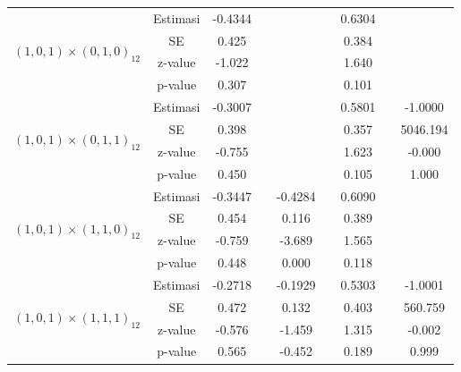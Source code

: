\begin{enumerate}[label=\alph*.]
\begin{longtable}{|c|c|c|c|c|c|c|c|c|}
            \multirow{4}{*}{$(1,0,1)\times(0,1,0)_{12}$}
            & Estimasi & -0.4344  & {} & {} & {} & 0.6304 & {} & {}\\ \cline{2-9}
            & SE       & 0.425 & {} & {} & {} & 0.384 & {} & {}\\ \cline{2-9}
            & z-value  & -1.022   & {} & {} & {} & 1.640 & {}& {}\\ \cline{2-9}
            & p-value  & 0.307 & {} & {} & {} & 0.101 & {} & {}\\ \hline

            \multirow{4}{*}{$(1,0,1)\times(0,1,1)_{12}$}
            & Estimasi & -0.3007  & {} & {} & {} & 0.5801 & {} & -1.0000\\ \cline{2-9}
            & SE       & 0.398 & {} & {} & {} & 0.357 & {} & 5046.194\\ \cline{2-9}
            & z-value  & -0.755  & {} & {} & {} & 1.623 & {}& -0.000\\ \cline{2-9}
            & p-value  & 0.450 & {} & {} & {} & 0.105 & {} & 1.000\\ \hline

            \multirow{4}{*}{$(1,0,1)\times(1,1,0)_{12}$}
            & Estimasi & -0.3447  & {} & -0.4284 & {} & 0.6090 & {} & {}\\ \cline{2-9}
            & SE       & 0.454 & {} &  0.116 & {} & 0.389 & {} & {}\\ \cline{2-9}
            & z-value  & -0.759  & {} & -3.689 & {} & 1.565 & {}& {}\\ \cline{2-9}
            & p-value  & 0.448 & {} & 0.000 & {} & 0.118 & {} & {}\\ \hline

            \multirow{4}{*}{$(1,0,1)\times(1,1,1)_{12}$}
            & Estimasi & -0.2718  & {} & -0.1929 & {} & 0.5303 & {} & -1.0001\\ \cline{2-9}
            & SE       & 0.472 & {} & 0.132 & {} & 0.403 & {} & 560.759\\ \cline{2-9}
            & z-value  & -0.576  & {} & -1.459 & {} & 1.315 & {}& -0.002\\ \cline{2-9}
            & p-value  & 0.565 & {} & -0.452 & {} & 0.189 & {} & 0.999\\ \hline


\end{longtable}
\end{enumerate}
